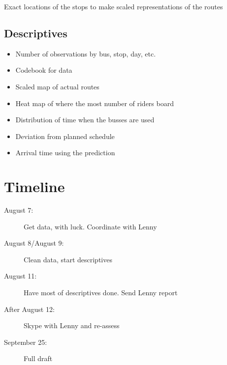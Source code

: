 \documentclass{article}
\begin{document}
Exact locations of the stops to make scaled representations of the routes

\subsection{Descriptives}

\begin{itemize}
	\item Number of observations by bus, stop, day, etc.
	\item Codebook for data
	\item Scaled map of actual routes
	\item Heat map of where the most number of riders board
	\item Distribution of time when the busses are used
	\item Deviation from planned schedule
	\item Arrival time using the prediction
\end{itemize}

\section{Timeline}

\begin{description}	
	\item[August 7:]{Get data, with luck. Coordinate with Lenny}
	\item[August 8/August 9:]{Clean data, start descriptives}
	\item[August 11:]{Have most of descriptives done. Send Lenny report}
	\item[After August 12:]{Skype with Lenny and re-assess}
	\item[September 25:]{Full draft}
\end{description}
\end{document}
